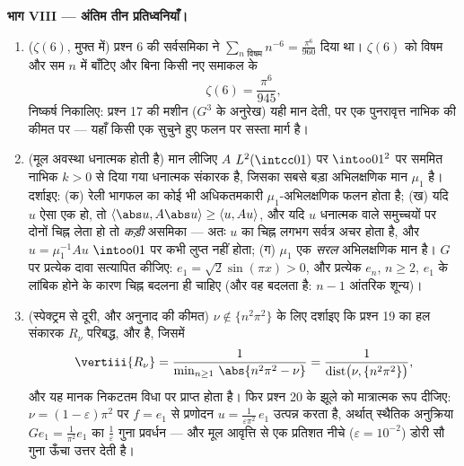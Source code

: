 \begin{problem}[{सप्ताहांत समस्या --- ग्रीन संकारक, ज्या आधार,
और एक अनुरेख सूत्र}]
\medskip
\noindent\textbf{भाग VIII --- अंतिम तीन प्रतिध्वनियाँ।}
\begin{enumerate}[resume]
  \item ($\zeta(6)$, मुफ्त में) प्रश्न 6 की  सर्वसमिका ने
        $\sum_{n\text{ विषम}}n^{-6} =
        \frac{\pi^6}{960}$ दिया था। $\zeta(6)$ को विषम और सम $n$ में बाँटिए और
        बिना किसी नए समाकल के
        \[
        \zeta(6) = \frac{\pi^6}{945},
        \]
        निष्कर्ष निकालिए: प्रश्न 17 की मशीन ($G^3$ के अनुरेख) यही
        मान देती, पर एक पुनरावृत्त नाभिक की कीमत पर --- यहाँ किसी
        एक सुचुने हुए फलन पर  सस्ता मार्ग है।
  \item (मूल अवस्था धनात्मक होती है) मान लीजिए $A$ $L^2(\intcc01)$ पर
        $\intoo01^2$ पर  सममित नाभिक $k > 0$ से दिया गया  
        धनात्मक संकारक है, जिसका सबसे बड़ा अभिलक्षणिक मान $\mu_1$ है।
        दर्शाइए: (क) रेली भागफल का कोई भी अधिकतमकारी $\mu_1$-अभिलक्षणिक
        फलन होता है; (ख) यदि $u$ ऐसा एक हो, तो $\langle\abs u, A\abs u\rangle \geq \langle u,
        Au\rangle$, और यदि
        $u$ धनात्मक  वाले समुच्चयों पर दोनों चिह्न लेता हो तो
        \emph{कड़ी} असमिका --- अतः $u$ का चिह्न लगभग सर्वत्र अचर
        होता है, और $u = \mu_1^{-1}Au$ $\intoo01$ पर कभी लुप्त नहीं होता; (ग) $\mu_1$
        एक \emph{सरल} अभिलक्षणिक मान है। $G$ पर प्रत्येक दावा
        सत्यापित कीजिए: $e_1 = \sqrt2\sin(\pi x) > 0$, और प्रत्येक $e_n$, $n
        \geq 2$, $e_1$ के
        लांबिक होने के कारण चिह्न बदलना ही चाहिए (और वह बदलता है:
        $n - 1$ आंतरिक शून्य)।
  \item (स्पेक्ट्रम से दूरी, और अनुनाद की कीमत) $\nu \notin \{n^2\pi^2\}$ के लिए
        दर्शाइए कि प्रश्न 19 का हल संकारक $R_\nu$ परिबद्ध,
         और  है, जिसमें
        \[
        \vertiii{R_\nu} =
        \frac1{\min_{n\geq1}\,\abs{n^2\pi^2 - \nu}}
        = \frac1{\operatorname{dist}\bigl(\nu,
        \{n^2\pi^2\}\bigr)},
        \]
        और यह मानक निकटतम विधा पर प्राप्त होता है। फिर प्रश्न 20
        के झूले को मात्रात्मक रूप दीजिए: $\nu = (1 - \varepsilon)\pi^2$ पर $f = e_1$ से प्रणोदन
        $u =
        \frac{1}{\varepsilon\pi^2}\,e_1$ उत्पन्न करता है, अर्थात् स्थैतिक अनुक्रिया $Ge_1 =
        \frac1{\pi^2}e_1$ का
        $\frac1\varepsilon$ गुना प्रवर्धन --- और मूल आवृत्ति से एक प्रतिशत नीचे
        ($\varepsilon = 10^{-2}$) डोरी सौ गुना ऊँचा उत्तर देती है।
\end{enumerate}
\end{problem}
